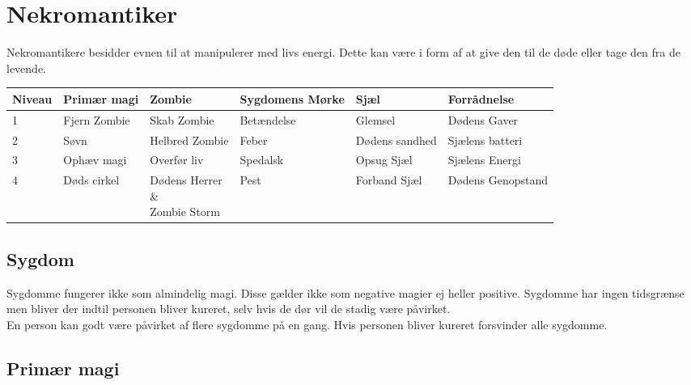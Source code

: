 \chapter{Nekromantiker}
Nekromantikere besidder evnen til at manipulerer med livs energi. Dette kan være i form af at give den til de døde eller tage den fra de levende.

\begin{table}[H]
    \centering
    \begin{tabular}{|p{}|p{}|p{}|p{}|p{}|p{}|}
    \rowcolor{cerulean!80}\hline
        Niveau & Primær magi & Zombie & Sygdomens Mørke  & Sjæl & Forrådnelse \\\hline
        
        1 & 
        Fjern Zombie & 
        Skab Zombie & 
        Betændelse & 
        Glemsel& 
        Dødens Gaver\\\hline
        
        2 & 
        Søvn & 
        Helbred Zombie & 
        Feber & 
        Dødens sandhed& 
        Sjælens batteri\\\hline
        
        3 & 
        Ophæv magi & 
        Overfør liv& 
        Spedalsk & 
        Opsug Sjæl& 
        Sjælens Energi\\\hline
        
        4 & 
        Døds cirkel & 
        \small\makecell{Dødens Herrer \\\&\\ Zombie Storm}& 
        Pest & 
        Forband Sjæl& 
        Dødens Genopstand 
        \\\hline
    \end{tabular}
\end{table}

\section{Sygdom}
Sygdomme fungerer ikke som almindelig magi. Disse gælder ikke som negative magier ej heller positive. Sygdomme har ingen tidsgrænse men bliver der indtil personen bliver kureret, selv hvis de dør vil de stadig være påvirket.\\
En person kan godt være påvirket af flere sygdomme på en gang. Hvis personen bliver kureret forsvinder alle sygdomme.

\section{Primær magi}

